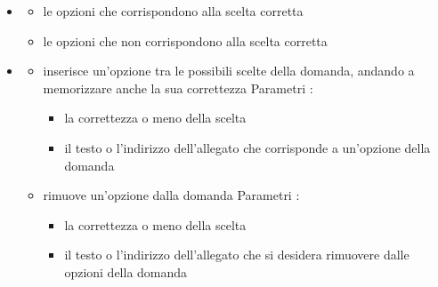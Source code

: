 \begin{itemize}
\item {}
\begin{itemize}
\item {}
\newline
le opzioni che corrispondono alla scelta corretta
\item {}
\newline
le opzioni che non corrispondono alla scelta corretta
\end{itemize}
\item {}
\begin{itemize}
\item {}
\newline
inserisce un'opzione tra le possibili scelte della domanda, andando a memorizzare anche la sua correttezza
\newline
Parametri :
\begin{itemize}
\item {}
\newline
la correttezza o meno della scelta
\item {}
\newline
il testo o l'indirizzo dell'allegato che corrisponde a un'opzione della domanda
\end{itemize}
\item {}
\newline
rimuove un'opzione dalla domanda
\newline
Parametri :
\begin{itemize}
\item {}
\newline
la correttezza o meno della scelta
\item {}
\newline
il testo o l'indirizzo dell'allegato che si desidera rimuovere dalle opzioni della domanda
\end{itemize}
\end{itemize}
\end{itemize}
